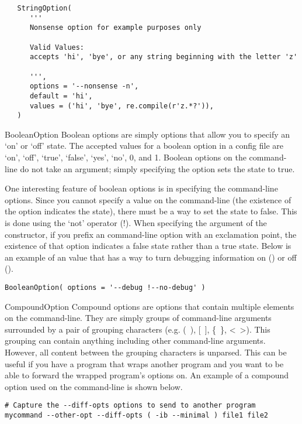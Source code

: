 \begin{verbatim}
   StringOption(
      '''
      Nonsense option for example purposes only

      Valid Values:
      accepts 'hi', 'bye', or any string beginning with the letter 'z'

      ''',
      options = '--nonsense -n',
      default = 'hi',
      values = ('hi', 'bye', re.compile(r'z.*?')),
   )
\end{verbatim}

\begin{classdesc}{BooleanOption}{}
Boolean options are simply options that allow you to specify an `on' or 
`off' state.  The accepted values for a boolean option in a config file
are `on', `off', `true', `false', `yes', `no', 0, and 1.  Boolean options on
the command-line do not take an argument; simply specifying the option
sets the state to true.

One interesting feature of boolean options is in specifying the command-line
options.  Since you cannot specify a value on the command-line (the existence
of the option indicates the state), there must be a way to set the state to
false.  This is done using the `not' operator (!).  When specifying the 
 argument of the constructor, if you prefix an command-line 
option with an exclamation point, the existence of that option indicates
a false state rather than a true state.  Below is an example of an 
value that has a way to turn debugging information on () 
or off ().
\begin{verbatim}
BooleanOption( options = '--debug !--no-debug' )
\end{verbatim}
\end{classdesc}

\begin{classdesc}{CompoundOption}{}
Compound options are options that contain multiple elements on the 
command-line.  They are simply groups of command-line arguments surrounded
by a pair of grouping characters (e.g. (~), [~], \{~\}, <~>).  This grouping
can contain anything including other command-line arguments.  However, 
all content between the grouping characters is unparsed.  This can be useful
if you have a program that wraps another program and you want to be able
to forward the wrapped program's options on.  An example of a compound option
used on the command-line is shown below.
\begin{verbatim}
# Capture the --diff-opts options to send to another program
mycommand --other-opt --diff-opts ( -ib --minimal ) file1 file2
\end{verbatim}
\end{classdesc}

